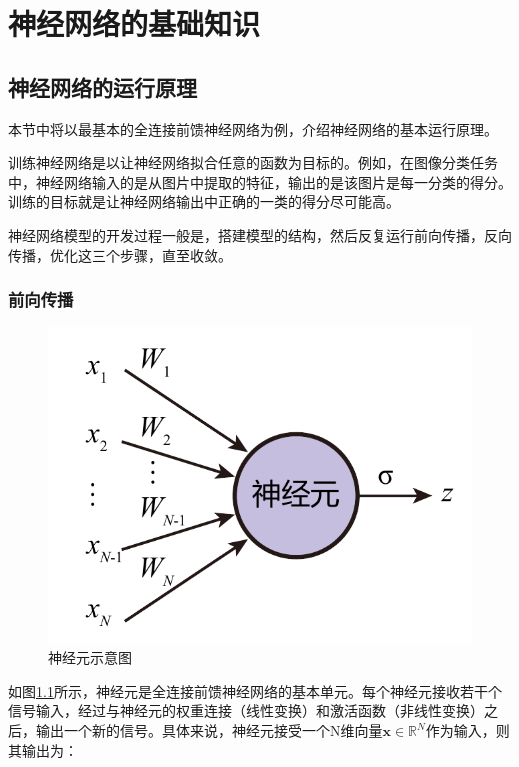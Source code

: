 \chapter{神经网络的基础知识}

\section{神经网络的运行原理}

本节中将以最基本的全连接前馈神经网络为例，介绍神经网络的基本运行原理。

训练神经网络是以让神经网络拟合任意的函数为目标的。例如，在图像分类任务中，神经网络输入的是从图片中提取的特征，输出的是该图片是每一分类的得分。训练的目标就是让神经网络输出中正确的一类的得分尽可能高。

神经网络模型的开发过程一般是，搭建模型的结构，然后反复运行前向传播，反向传播，优化这三个步骤，直至收敛。

\subsection{前向传播}

\begin{figure}[]
    \centering
    \includegraphics[page=1]{figure/figures.pdf}
    \caption{神经元示意图}
    \label{nunit}
\end{figure}

如图\ref{nunit}所示，神经元是全连接前馈神经网络的基本单元。每个神经元接收若干个信号输入，经过与神经元的权重连接（线性变换）和激活函数（非线性变换）之后，输出一个新的信号。具体来说，神经元接受一个N维向量$\bm{x}\in\mathbb{R}^N$作为输入，则其输出为：

